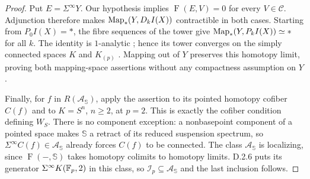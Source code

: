 \begin{proof}
Put $E=\Sigma^\infty Y$. Our hypothesis implies
$\operatorname{F}(E,V)=0$ for every $V\in\mathcal C$.
Adjunction therefore makes $\operatorname{Map}_*(Y,D_kI(X))$ contractible in both
cases. Starting from $P_0I(X)=*$, the fibre sequences of the tower
give $\operatorname{Map}_*(Y,P_kI(X))\simeq *$ for all $k$. The identity is
$1$-analytic \cite[Example~4.3]{FGHGoodwillie1992}; hence its tower
converges on the simply connected spaces $K$ and $K_{(p)}$
\cite[Theorem~1.13]{FGHGoodwillie2003}. Mapping out of $Y$ preserves
this homotopy limit, proving both mapping-space assertions without
any compactness assumption on $Y$.

Finally, for $f$ in $R(\mathcal A_{\mathbb S})$, apply the assertion
to its pointed homotopy cofiber $C(f)$ and to $K=S^n$, $n\geq2$,
at $p=2$. This is exactly the cofiber condition defining $W_S$.
There is no component exception: a nonbasepoint component of a
pointed space makes $\mathbb S$ a retract of its reduced suspension
spectrum, so $\Sigma^\infty C(f)\in\mathcal A_{\mathbb S}$ already
forces $C(f)$ to be connected. The class $\mathcal A_{\mathbb S}$
is localizing, since $\operatorname{F}(-,\mathbb S)$ takes
homotopy colimits to homotopy limits. D.2.6 puts its generator
$\Sigma^\infty K(\mathbb F_p,2)$ in this class, so
$\mathcal I_p\subseteq\mathcal A_{\mathbb S}$ and the last inclusion
follows.
\end{proof}

